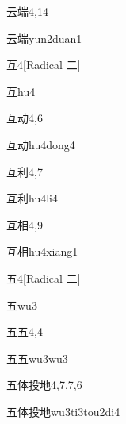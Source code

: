 \begin{entry}{云端}{4,14}
  \begin{phonetics}{云端}{yun2duan1}
  \end{phonetics}
\end{entry}

\begin{entry}{互}{4}[Radical ⼆]
  \begin{phonetics}{互}{hu4}
  \end{phonetics}
\end{entry}

\begin{entry}{互动}{4,6}
  \begin{phonetics}{互动}{hu4dong4}
  \end{phonetics}
\end{entry}

\begin{entry}{互利}{4,7}
  \begin{phonetics}{互利}{hu4li4}
  \end{phonetics}
\end{entry}

\begin{entry}{互相}{4,9}
  \begin{phonetics}{互相}{hu4xiang1}
  \end{phonetics}
\end{entry}

\begin{entry}{五}{4}[Radical 二]
  \begin{phonetics}{五}{wu3}
  \end{phonetics}
\end{entry}

\begin{entry}{五五}{4,4}
  \begin{phonetics}{五五}{wu3wu3}
  \end{phonetics}
\end{entry}

\begin{entry}{五体投地}{4,7,7,6}
  \begin{phonetics}{五体投地}{wu3ti3tou2di4}
  \end{phonetics}
\end{entry}

